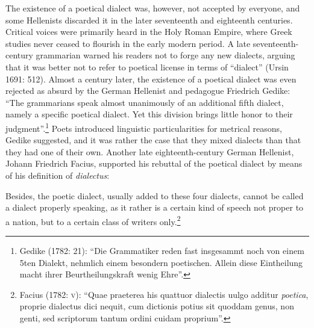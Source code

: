 \begin{styleStandard}
The existence of a poetical dialect was, however, not accepted by everyone, and some Hellenists discarded it in the later seventeenth and eighteenth centuries. Critical voices were primarily heard in the Holy Roman Empire, where Greek studies never ceased to flourish in the early modern period. A late seventeenth-century grammarian warned his readers not to forge any new dialects, arguing that it was better not to refer to poetical license in terms of “dialect” (Ursin 1691: 512). Almost a century later, the existence of a poetical dialect was even rejected as absurd by the German Hellenist and pedagogue Friedrich Gedike: “The grammarians speak almost unanimously of an additional fifth dialect, namely a specific poetical dialect. Yet this division brings little honor to their judgment”.\footnote{ Gedike (1782: 21): “Die Grammatiker reden fast insgesammt noch von einem 5ten Dialekt, nehmlich einem besondern poetischen. Allein diese Eintheilung macht ihrer Beurtheilungskraft wenig Ehre”.} Poets introduced linguistic particularities for metrical reasons, Gedike suggested, and it was rather the case that they mixed dialects than that they had one of their own. Another late eighteenth-century German Hellenist, Johann Friedrich Facius, supported his rebuttal of the poetical dialect by means of his definition of \textit{dialectus}:
\end{styleStandard}

\begin{styleQuote}
Besides, the poetic dialect, usually added to these four dialects, cannot be called a dialect properly speaking, as it rather is a certain kind of speech not proper to a nation, but to a certain class of writers only.\footnote{ Facius (1782: \textsc{v}): “Quae praeterea his quattuor dialectis uulgo additur \textit{poetica}, proprie dialectus dici nequit, cum dictionis potius sit quoddam genus, non genti, sed scriptorum tantum ordini cuidam proprium”.}
\end{styleQuote}

